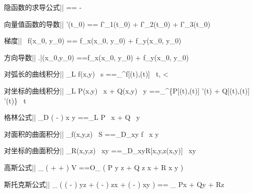 





隐函数的求导公式||
== -


向量值函数的导数||
'(t_0)
== f'_1(t_0) + f'_2(t_0) + f'_3(t_0)


梯度||
 \, f(x_0, y_0)
== f_x(x_0, y_0) + f_y(x_0, y_0)


方向导数||
\left.\right|{(x_0,y_0)}
==f_x(x_0, y_0) \cos\alpha + f_y(x_0, y_0) \cos\beta


对弧长的曲线积分||
\int_L f(x,y) \, s
==\int_\alpha^\beta f[\phi(t),\psi(t)]  \, t, \quad \alpha < \beta


对坐标的曲线积分||
\int_L P(x,y) \, x + Q(x,y) \, y
==\int_\alpha^\beta \left\{P[\phi(t),\psi(t)] \phi'(t) + Q[\phi(t),\psi(t)] \psi'(t)\right\} \, t

格林公式||
\iint_D \left( - \right) x y
==\oint_L P \, x + Q \, y

对面积的曲面积分||
\iint_\Sigma f(x,y,z) \, S
==\iint_{D_{xy}} f\big[x,y,z(x,y)\big]  \, x y

对坐标的曲面积分||
\iint_\Sigma R(x,y,z) \, xy
==\iint_{D_{xy}}R[x,y,z(x,y)] \, xy

高斯公式||
\iiint_{\Omega} \left(  +  +  \right) V
==O\iint_{\Sigma} \left( P y z + Q z x + R x y \right)

斯托克斯公式||
\iint_{\Sigma} \left(
  \left( - \right) yz +
  \left( - \right) zx +
  \left( - \right) xy
\right) == \oint_{\Gamma} Px + Qy + Rz

